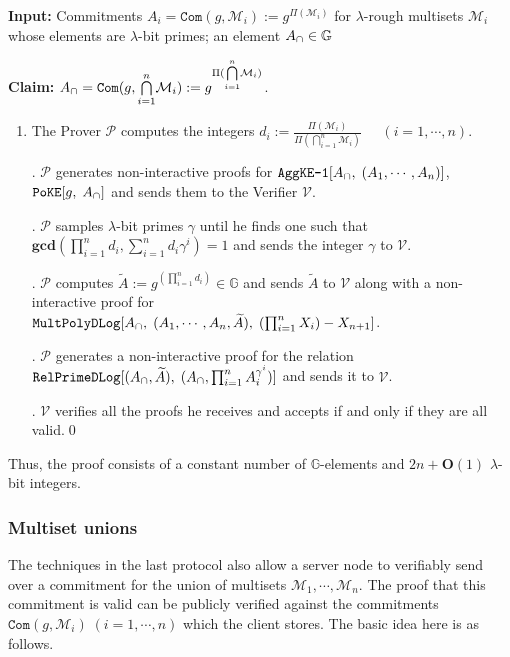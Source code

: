 \documentclass[11pt, lettersize, notitlepage, leqno, footskip=0.6cm]{article}
\newcommand{\pl}{\prod\limits}
\newcommand{\slim}{\sum\limits}
\newcommand{\ttt}{\texttt}
\newcommand{\bG}{\mathbb{G}}
\newcommand{\pr}{\protect}
\newcommand{\wti}{\widetilde}
\newcommand{\mc}{\mathcal}
\newcommand{\mb}{\mathbb}
\newcommand{\mbf}{\mathbf}
\newcommand{\lam}{\lambda}
\newcommand{\bO}{\mbf{O}}
\newcommand{\mP}{\mc{P}}
\newcommand{\V}{\mc{V}}
\newcommand{\mcM}{\mc{M}}
\newcommand{\vs}{\vspace{-0.15cm}}
\newcommand{\noin}{\noindent}
\newcommand{\GCD}{\mbf{gcd}}
\numberwithin{equation}{section}
\begin{document}
\noin \textbf{Input:} Commitments $A_i = \ttt{Com}(g, \mcM_i) := g^{\Pi(\mc{M}_i)}$ for $\lam$-rough multisets $\mc{M}_i$ whose elements are $\lam$-bit primes; an element $A_{\tt{\cap}}\in\mb{G}$

\noin \textbf{Claim:} $A_{\tt{\cap}} = \protect{\verb|Com|}(g, {\bigcap\limits_{i=1}^n} \mc{M}_i) := g^{\Pi({\bigcap\limits_{i=1}^n} \mc{M}_i)}$.

\begin{enumerate}[wide, labelwidth=!, labelindent=0pt]\vs \item The Prover $\mP$ computes the integers $d_i:= \frac{\Pi(\mc{M}_i)}{\Pi({\bigcap\limits_{i=1}^n} \mc{M}_i)}\;\;\;\;\; (i=1,\cdots,n).$

\noin 2. $\mP$ generates non-interactive proofs for $\pr{\ttt{AggKE-1}}[A_{\tt{\cap}},\;(A_1,\cdots,A_n)]$, $\ttt{PoKE}[g,\;A_{\tt{\cap}}]$ and sends them to the Verifier $\V$.

\noin 3. $\mP$ samples $\lam$-bit primes $\gamma$ until he finds one such that $ \GCD(\pl_{i=1}^n d_i, \slim_{i=1}^n d_i\gamma^i) = 1$ and sends the integer $\gamma$ to $\V$.

\noin 4. $\mP$ computes $\wti{A}:= g^{(\prod_{i=1}^n d_i)}\in\bG$ and sends $\wti{A}$ to $\V$ along with a non-interactive proof for\\ $\ttt{MultPolyDLog}[A_{\tt{\cap}},\; (A_1,\cdots,A_n, \wti{A}),\;(\prod_{i=1}^n X_i)-X_{n+1}]$.

\noin 5. $\mP$ generates a non-interactive proof for the relation $\ttt{RelPrimeDLog}[(A_{\tt{\cap}}, \wti{A}),\;(A_{\tt{\cap}}, \prod_{i=1}^n A_i^{\gamma^i})]$ and sends it to $\V$.

\noin 6. $\V$ verifies all the proofs he receives and accepts if and only if they are all valid.\qed \end{enumerate}


\noin Thus, the proof consists of a constant number of $\bG$-elements and $2n+\bO(1)$ $\lam$-bit integers. 
 




\subsubsection{\fontsize{11}{11}\selectfont Multiset unions }

\noin The techniques in the last protocol also allow a server node to verifiably send over a commitment for the union of multisets $\mcM_1,\cdots,\mcM_n$. The proof that this commitment is valid can be publicly verified against the commitments $\ttt{Com}(g,\mc{M}_i)\;(i=1,\cdots,n)$ which the client stores. The basic idea here is as follows.
\end{document}
